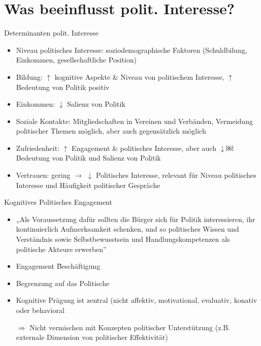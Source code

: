 \documentclass[11pt]{beamer}
\begin{document}
\section{Was beeinflusst polit. Interesse?}

\begin{frame}{Determinanten polit. Interesse \parencite{vanDeth2004}}
	\begin{itemize}
		\item	Niveau politisches Interesse: soziodemographische Faktoren (Schuldbilung, Einkommen, gesellschaftliche Position)
		\item Bildung: $\uparrow$ kognitive Aspekte \& Niveau von politischem Interesse, $\uparrow$ Bedeutung von Politik positiv
		\item Einkommen: $\downarrow$ Salienz von Politik
		\item Soziale Kontakte: Mitgliedschaften in Vereinen und Verbänden, Vermeidung politischer Themen möglich, aber auch gegensätzlich möglich
		\item Zufriedenheit: $\uparrow$ Engagement \& politisches Interesse, aber auch $\downarrow$￼ Bedeutung von Politik und Salienz von Politik
		\item Vertrauen: gering $\rightarrow$ $\downarrow$ Politisches Interesse, relevant für Niveau politisches Interesse und Häufigkeit politischer Gespräche
	\end{itemize}
\end{frame}

\begin{frame}{Kognitives Politisches Engagement \parencite{Westle2020}}
	\begin{itemize}
		\item	„Als Voraussetzung dafür sollten die Bürger sich für Politik interessieren, ihr kontinuierlich Aufmerksamkeit schenken, und so politisches Wissen und Verständnis sowie Selbstbewusstsein und Handlungskompetenzen als politische Akteure erwerben” \parencite[273]{Westle2020}
	\end{itemize}
	
	\begin{itemize}
		\item Engagement \= Beschäftigung \parencite[278]{Westle2020}
		\item Begrenzung auf das Politische \parencite[278]{Westle2020}
		\item Kognitive Prägung ist zentral (nicht affektiv, motivational, evaluativ, konativ oder behavioral \parencite[278]{Westle2020}
		\item[$\Rightarrow$] Nicht vermischen mit Konzepten politischer Unterstützung (z.B. externale Dimension von politischer Effektivität)
	\end{itemize}
\end{frame}
\end{document}
